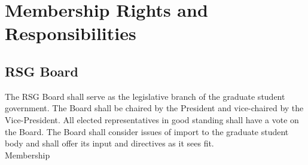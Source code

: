 
\chapter{Membership Rights and Responsibilities} 

\section{RSG Board} The RSG Board shall serve as the legislative branch of the graduate 
student government. The Board shall be chaired by the President and vice-chaired by the Vice-President. All elected representatives in good standing shall have a vote on the Board. The Board shall consider issues of import to the graduate student body and shall offer its input and directives as it sees fit.\\[1cm]
Membership
